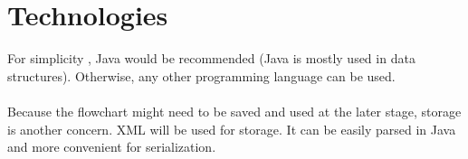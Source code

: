 \section{Technologies}
For simplicity , Java would be recommended (Java is mostly used in data structures). Otherwise, any other programming language can be used.\\ \\
Because the flowchart might need to be saved and used at the later stage, storage is another concern. XML will be used for storage. It can be easily parsed in Java and more convenient for serialization.




